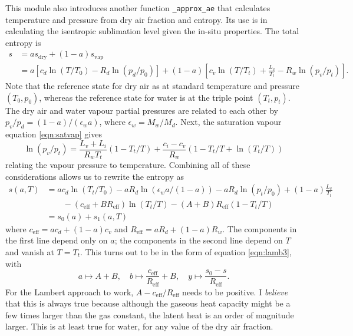\documentclass{article}
\newcommand{\vap}{\text{vap}}
\newcommand{\dry}{\text{dry}}
\newcommand{\eff}{\text{eff}}
\newcommand{\epsw}{\epsilon_w}
\begin{document}
This module also introduces another function \texttt{\_approx\_ae} that calculates temperature and pressure from dry air fraction and entropy. Its use is in calculating the isentropic sublimation level given the in-situ properties. The total entropy is
\begin{align*}
    s &= a s_{\dry} + (1-a) s_{\vap} \\
    &= a [c_d \ln(T/T_0) - R_d \ln(p_d/p_0)] + (1-a) \left[ c_v \ln(T/T_t) + \frac{L_v}{T_t} - R_w \ln(p_v/p_t) \right].
\end{align*}
Note that the reference state for dry air as at standard temperature and pressure $(T_0,p_0)$, whereas the reference state for water is at the triple point $(T_t,p_t)$. The dry air and water vapour partial pressures are related to each other by $p_v/p_d = (1-a)/(\epsw a)$, where $\epsw = M_w/M_d$. Next, the saturation vapour equation \ref{eqn:satvap} gives
\begin{equation*}
    \ln(p_v/p_t) = \frac{L_v + L_i}{R_w T_t} (1 - T_t/T) + \frac{c_i - c_v}{R_w} (1 - T_t/T + \ln(T_t/T))
\end{equation*}
relating the vapour pressure to temperature. Combining all of these considerations allows us to rewrite the entropy as
\begin{align*}
    s(a,T) &= a c_d \ln(T_t/T_0) - a R_d \ln(\epsw a/(1-a)) - a R_d \ln(p_t/p_0) + (1-a) \frac{L_v}{T_t} \\
    &\qquad - (c_{\eff} + B R_{\eff}) \ln(T_t/T) - (A+B) R_{\eff} (1 - T_t/T) \\
    &= s_0(a) + s_1(a,T)
\end{align*}
where $c_{\eff} = a c_d + (1-a) c_v$ and $R_{\eff} = a R_d + (1-a) R_w$. The components in the first line depend only on $a$; the components in the second line depend on $T$ and vanish at $T=T_t$. This turns out to be in the form of equation \ref{eqn:lamb3}, with
\begin{equation*}
    a \mapsto A+B, \quad b \mapsto \frac{c_{\eff}}{R_{\eff}} + B, \quad y \mapsto \frac{s_0 - s}{R_{\eff}}.
\end{equation*}
For the Lambert approach to work, $A-c_{\eff}/R_{\eff}$ needs to be positive. I {\textit{believe}} that this is always true because although the gaseous heat capacity might be a few times larger than the gas constant, the latent heat is an order of magnitude larger. This is at least true for water, for any value of the dry air fraction.
\end{document}
